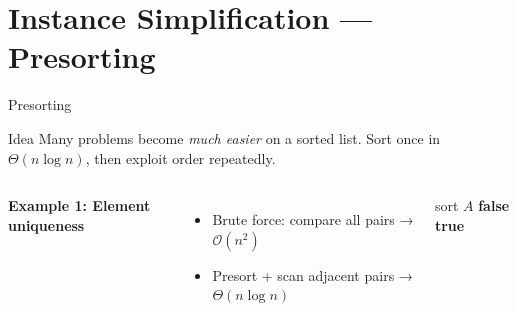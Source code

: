 \documentclass[aspectratio=169]{beamer}
\begin{document}
\section{Instance Simplification — Presorting}

\begin{frame}[shrink=20]{Presorting}
  \begin{block}{Idea}
    Many problems become \emph{much easier} on a sorted list.
    Sort once in $\Theta(n\log n)$, then exploit order repeatedly.
  \end{block}
  \vspace{0.3em}
  \begin{columns}[T]
      \textbf{Example 1: Element uniqueness}
      \begin{itemize}
        \item Brute force: compare all pairs → $\mathcal{O}(n^2)$
        \item Presort + scan adjacent pairs → $\Theta(n\log n)$
      \end{itemize}
      \begin{algorithmic}[1]
        \State sort $A$
           \Return \textbf{false} \EndIf
        \EndFor
        \State \Return \textbf{true}
      \end{algorithmic}


\end{columns}
\end{frame}
\end{document}
